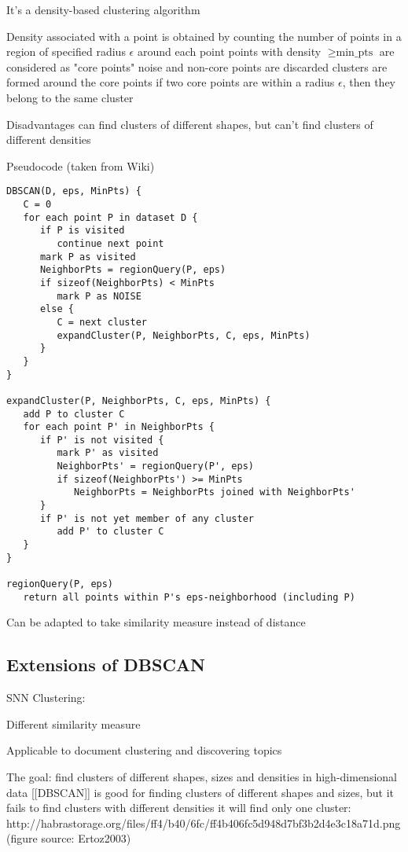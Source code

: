 It's a density-based clustering algorithm


Density associated with a point is obtained by counting the number of points in a region of specified radius $\epsilon$ around each point
 points with density $\geqslant \text{min\_pts}$ are considered as "core points"
 noise and non-core points are discarded
 clusters are formed around the core points
 if two core points are within a radius $\epsilon$, then they belong to the same cluster



Disadvantages
 can find clusters of different shapes, but can't find clusters of different densities

Pseudocode (taken from Wiki)

\begin{verbatim}
DBSCAN(D, eps, MinPts) {
   C = 0
   for each point P in dataset D {
      if P is visited
         continue next point
      mark P as visited
      NeighborPts = regionQuery(P, eps)
      if sizeof(NeighborPts) < MinPts
         mark P as NOISE
      else {
         C = next cluster
         expandCluster(P, NeighborPts, C, eps, MinPts)
      }
   }
}

expandCluster(P, NeighborPts, C, eps, MinPts) {
   add P to cluster C
   for each point P' in NeighborPts {
      if P' is not visited {
         mark P' as visited
         NeighborPts' = regionQuery(P', eps)
         if sizeof(NeighborPts') >= MinPts
            NeighborPts = NeighborPts joined with NeighborPts'
      }
      if P' is not yet member of any cluster
         add P' to cluster C
   }
}

regionQuery(P, eps)
   return all points within P's eps-neighborhood (including P)
\end{verbatim}

Can be adapted to take similarity measure instead of distance



\subsection{Extensions of DBSCAN} \label{sec:dbscan-ext}

SNN Clustering: \cite{ertoz2003finding}

Different similarity measure

Applicable to document clustering and discovering topics \cite{ertoz2004finding}

The goal:
find clusters of different shapes, sizes and densities in high-dimensional data
 [[DBSCAN]] is good for finding clusters of different shapes and sizes, but it fails to find clusters with different densities
it will find only one cluster:
 http://habrastorage.org/files/ff4/b40/6fc/ff4b406fc5d948d7bf3b2d4e3c18a71d.png
 (figure source: Ertoz2003)


